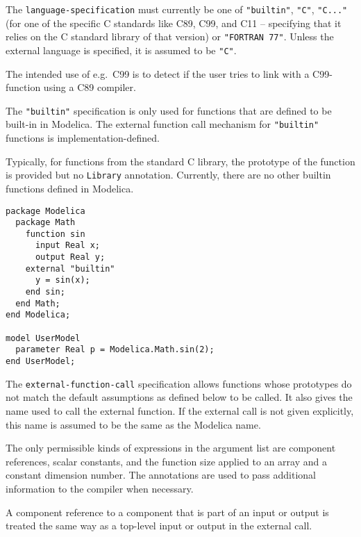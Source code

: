 The \lstinline[language=grammar]!language-specification! must currently be one of \lstinline!"builtin"!, \lstinline!"C"!, \lstinline!"C..."! (for one of the specific C standards like C89, C99, and C11 -- specifying
that it relies on the C standard library of that version) or \lstinline!"FORTRAN 77"!.  Unless the external language is specified, it is assumed to be \lstinline!"C"!.

\begin{nonnormative}
The intended use of e.g.\ C99 is to detect if the user tries to link with a C99-function using a C89 compiler.
\end{nonnormative}

The \lstinline!"builtin"! specification is only used for functions that are defined to be built-in in Modelica.  The external function call mechanism for \lstinline!"builtin"! functions is implementation-defined.

\begin{nonnormative}
Typically, for functions from the standard C library, the prototype of the function is provided but no \lstinline!Library! annotation.  Currently, there are no other builtin functions defined in Modelica.
\end{nonnormative}

\begin{example}
\begin{lstlisting}[language=modelica]
package Modelica
  package Math
    function sin
      input Real x;
      output Real y;
    external "builtin"
      y = sin(x);
    end sin;
  end Math;
end Modelica;

model UserModel
  parameter Real p = Modelica.Math.sin(2);
end UserModel;
\end{lstlisting}
\end{example}

The \lstinline[language=grammar]!external-function-call! specification allows functions whose prototypes do not match the default assumptions as defined below to be called.  It also gives the name used to call the external function.  If the external call is not given explicitly, this name is assumed to be the same as the Modelica name.

The only permissible kinds of expressions in the argument list are
component references, scalar constants, and the function size applied to
an array and a constant dimension number. The annotations are used to
pass additional information to the compiler when necessary.

A component reference to a component that is part of an input or output
is treated the same way as a top-level input or output in the external
call.

